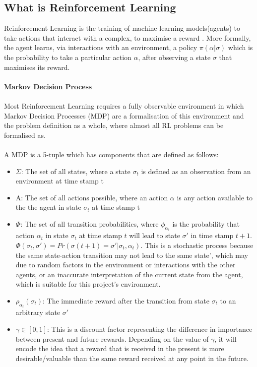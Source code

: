 \documentclass[ %
                    author={Ashwinder Khurana},
                supervisor={Prof Dave Cliff},
                    degree={MEng},
                     title={The Deeply Reinforced Trader},
                  subtitle={},
                      type={enterprise},
                      year={2020} ]{dissertation}
\begin{document}
\subsection{What is Reinforcement Learning}
Reinforcement Learning is the training of machine learning models(agents) to take actions that interact with a complex, to maximise a reward {}. More formally, the agent learns, via interactions with an environment, a policy $\pi(\alpha|\sigma)$ which is the probability to take a particular action $\alpha$, after observing a state $\sigma$ that maximises its reward. 
\\
\\
\noindent
\textbf{Markov Decision Process}
\\
\\
Most Reinforcement Learning requires a fully observable environment in which Markov Decision Processes (MDP) are a formalisation of this environment and the problem definition as a whole, where almost all RL problems can be formalised as. 
\\
\\
\noindent 
A MDP is a 5-tuple which has components that are defined as follows:
\begin{itemize}
\item $\Sigma$: The set of all states, where a state $\sigma_t$ is defined as an observation from an 
environment at time stamp t
\item  A: The set of all actions possible, where an action $\alpha$ is any action available to the the agent in state $\sigma_t$ at time stamp t
\item $\Phi$: The set of all transition probabilities, where $\phi_{\alpha_t}$ is the probability that action $\alpha_t$ in state $\sigma_t$ at time stamp $t$ will lead to state $\sigma'$ in time stamp $t+1$. 
$\Phi(\sigma_t, \sigma') = Pr(\sigma(t+1) = \sigma' | \sigma_t, \alpha_t)$. This is a stochastic process because the same state-action transition may not lead to the same state', which may due to random factors in the environment or interactions with the other agents, or an inaccurate interpretation of the current state from the agent, which is suitable for this project's environment. 
\item $\rho_{\alpha_t}(\sigma_t)$: The immediate reward after the transition from state $\sigma_t$ to an arbitrary state $\sigma'$ 
\item $\gamma \in [0,1]$: This is a discount factor representing the difference in importance between present and future rewards. Depending on the value of $\gamma$, it will encode the idea that a reward that is received in the present is more desirable/valuable than the same reward received at any point in the future. 



\end{itemize}
\end{document}
